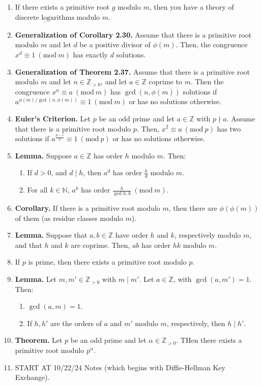 \documentclass[11pt]{article}
\theoremstyle{definition}
\theoremstyle{named}
\newcommand{\Mod}[1]{\ (\mathrm{mod}\ #1)}
\begin{document}
\begin{enumerate}
\begin{enumerate}
    \end{enumerate}
    \item If there exists a primitive root $g$ modulo $m$, then you have a theory of $\underline{\textrm{discrete logarithms}}$ modulo $m$. 
    \item \textbf{Generalization of Corollary 2.30. } Assume that there is a primitive root modulo $m$ and let $d$ be a positive divisor of $\phi(m)$. Then, the congruence $x^d \equiv 1 \Mod{m}$ has exactly $d$ solutions. 
    \item \textbf{Generalization of Theorem 2.37. } Assume that there is a primitive root modulo $m$ and let $n \in \mathbb{Z}_{>0}$, and let $a \in \mathbb{Z}$ coprime to $m$. Then the congruence $x^n \equiv a \Mod{m}$ has $\gcd(n,\phi(m))$ solutions if $a^{\phi(m)/\gcd(n,\phi(m))} \equiv 1 \Mod{m}$ or has no solutions otherwise. 
    \item \textbf{Euler's Criterion. } Let $p$ be an odd prime and let $a \in \mathbb{Z}$ with $p \nmid a$. Assume that there is a primitive root modulo $p$. Then, $x^2 \equiv a \Mod{p}$ has two solutions if $a^{\frac{p-1}{2}} \equiv 1 \Mod{p}$ or has no solutions otherwise. 
    \item \textbf{Lemma. } Suppose $a \in \mathbb{Z}$ has order $h$ modulo $m$. Then: 
    \begin{enumerate}
        \item If $d>0$, and $d \mid h$, then $a^d$ has order $\frac{h}{d}$ modulo $m$. 
        \item For all $k \in \mathbb{N}$, $a^k$ has order $\frac{h}{\gcd{h,k}} \Mod{m}$. 
    \end{enumerate}
    \item \textbf{Corollary. } If there is a primitive root modulo $m$, then there are $\phi(\phi(m))$ of them (as residue classes modulo $m$). 
    \item \textbf{Lemma. } Suppose that $a,b \in \mathbb{Z}$ have order $h$ and $k$, respectively modulo $m$, and that $h$ and $k$ are coprime. Then, $ab$ has order $hk$ modulo $m$. 
    \item If $p$ is prime, then there exists a primitive root modulo $p$. 
    \item \textbf{Lemma. } Let $m,m' \in \mathbb{Z}_{>0}$ with $m \mid m'$. Let $a \in \mathbb{Z}$, with $\gcd(a,m') = 1$. Then: 
    \begin{enumerate}
        \item $\gcd(a,m) = 1$. 
        \item If $h,h'$ are the orders of $a$ and $m'$ modulo $m$, respectively, then $h \mid h'$. 
    \end{enumerate}
    \item \textbf{Theorem. } Let $p$ be an odd prime and let $\alpha \in \mathbb{Z}_{>0}$. THen there exists a primitive root modulo $p^\alpha$. 
    \item START AT 10/22/24 Notes (which begins with Diffie-Hellman Key Exchange). 
\end{enumerate}
\end{document}

